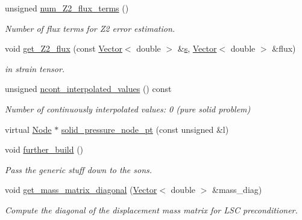\begin{DoxyCompactItemize}
unsigned \hyperlink{classoomph_1_1RefineablePVDEquationsWithPressure_a1d386c66a1d4124ba63d344bdc6a2bd2}{num\+\_\+\+Z2\+\_\+flux\+\_\+terms} ()
\begin{DoxyCompactList}\small\item\em Number of \textquotesingle{}flux\textquotesingle{} terms for Z2 error estimation. \end{DoxyCompactList}\item 
void \hyperlink{classoomph_1_1RefineablePVDEquationsWithPressure_a34b62df5ef5a8c6ee6e228a0c4d31582}{get\+\_\+\+Z2\+\_\+flux} (const \hyperlink{classoomph_1_1Vector}{Vector}$<$ double $>$ \&\hyperlink{cfortran_8h_ab7123126e4885ef647dd9c6e3807a21c}{s}, \hyperlink{classoomph_1_1Vector}{Vector}$<$ double $>$ \&flux)
\begin{DoxyCompactList}\small\item\em in strain tensor. \end{DoxyCompactList}\item 
unsigned \hyperlink{classoomph_1_1RefineablePVDEquationsWithPressure_a16bc4f58cc9a079c8db705306a23b41b}{ncont\+\_\+interpolated\+\_\+values} () const
\begin{DoxyCompactList}\small\item\em Number of continuously interpolated values\+: 0 (pure solid problem) \end{DoxyCompactList}\item 
virtual \hyperlink{classoomph_1_1Node}{Node} $\ast$ \hyperlink{classoomph_1_1RefineablePVDEquationsWithPressure_a4e94b11315f8345030fa4b3b923bd91b}{solid\+\_\+pressure\+\_\+node\+\_\+pt} (const unsigned \&l)
\item 
void \hyperlink{classoomph_1_1RefineablePVDEquationsWithPressure_aad92965f2aec749e75580d003eebdc91}{further\+\_\+build} ()
\begin{DoxyCompactList}\small\item\em Pass the generic stuff down to the sons. \end{DoxyCompactList}\item 
void \hyperlink{classoomph_1_1RefineablePVDEquationsWithPressure_ab15495baf81c012c6569f37b5c2b1e0f}{get\+\_\+mass\+\_\+matrix\+\_\+diagonal} (\hyperlink{classoomph_1_1Vector}{Vector}$<$ double $>$ \&mass\+\_\+diag)
\begin{DoxyCompactList}\small\item\em Compute the diagonal of the displacement mass matrix for L\+SC preconditioner. \end{DoxyCompactList}\end{DoxyCompactItemize}
